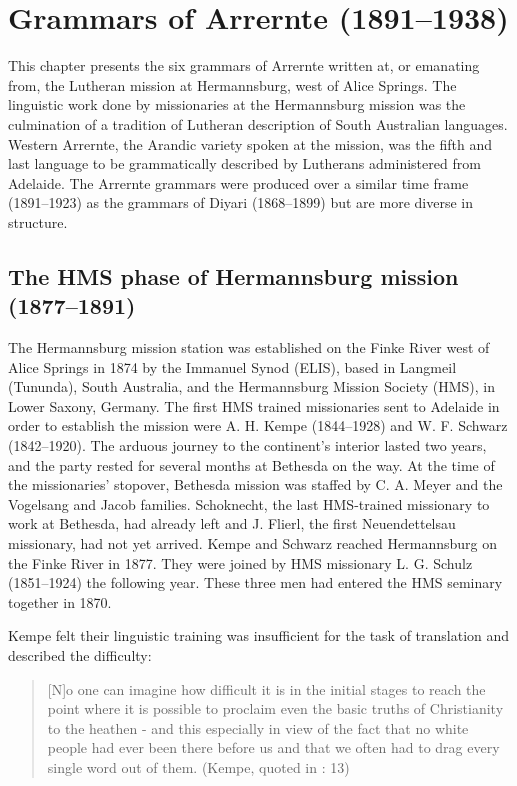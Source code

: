 \chapter{Grammars of Arrernte (1891--1938)}
\label{chap:key:9}

This chapter presents the six grammars of Arrernte written at, or emanating from, the Lutheran mission at Hermannsburg, west of Alice Springs. The linguistic work done by missionaries at the Hermannsburg mission was the culmination of a tradition of Lutheran description of South Australian languages. Western Arrernte, the Arandic variety spoken at the mission, was the fifth and last language to be grammatically described by Lutherans administered from Adelaide. The Arrernte grammars were produced over a similar time frame (1891--1923) as the grammars of Diyari (1868--1899) but are more diverse in structure.

\section{The HMS phase of Hermannsburg mission (1877--1891)}
\label{sec:key:9.1}\label{bkm:Ref514690108}
The Hermannsburg mission station was established on the Finke River west of Alice Springs in 1874 by the Immanuel Synod (ELIS), based in Langmeil (Tununda), South Australia, and the Hermannsburg Mission Society (HMS), in Lower Saxony, Germany. The first HMS trained missionaries sent to Adelaide in order to establish the mission were A. H. Kempe (1844--1928) and W. F. Schwarz (1842--1920). The arduous journey to the continent’s interior lasted two years, and the party rested for several months at Bethesda on the way. At the time of the missionaries' stopover, Bethesda mission was staffed by C. A. Meyer and the Vogelsang and Jacob families. Schoknecht, the last HMS-trained missionary to work at Bethesda, had already left and J. Flierl, the first Neuendettelsau missionary, had not yet arrived. Kempe and Schwarz reached Hermannsburg on the Finke River in 1877. They were joined by HMS missionary L. G. Schulz (1851--1924) the following year. These three men had entered the HMS seminary together in 1870.

Kempe felt their linguistic training was insufficient for the task of translation and described the difficulty:


\begin{quote}
[N]o one can imagine how difficult it is in the initial stages to reach the point where it is possible to proclaim even the basic truths of Christianity to the heathen - and this especially in view of the fact that no white people had ever been there before us and that we often had to drag every single word out of them. (Kempe, quoted in \citealt{scherer_joiners_1973}: 13)
\end{quote}


